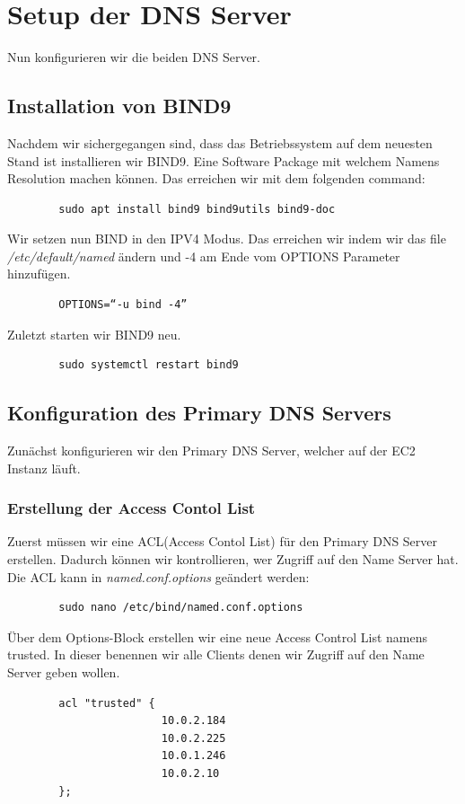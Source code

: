 \documentclass[a4paper,12pt]{article}
\begin{document}
\section{Setup der DNS Server}
Nun konfigurieren wir die beiden DNS Server.
\subsection{Installation von BIND9}
Nachdem wir sichergegangen sind, dass das Betriebssystem auf dem neuesten Stand ist installieren wir BIND9. 
Eine Software Package mit welchem Namens Resolution machen können. Das erreichen wir mit dem folgenden command:
\begin{verbatim}
		sudo apt install bind9 bind9utils bind9-doc
\end{verbatim}

Wir setzen nun BIND in den IPV4 Modus. Das erreichen wir indem wir das file \textit{/etc/default/named} ändern und -4 am Ende vom OPTIONS Parameter hinzufügen.
\begin{verbatim}
		OPTIONS=“-u bind -4”
\end{verbatim}
Zuletzt starten wir BIND9 neu.
\begin{verbatim}
		sudo systemctl restart bind9
\end{verbatim}



\subsection{Konfiguration des Primary DNS Servers}
Zunächst konfigurieren wir den Primary DNS Server, welcher auf der EC2 Instanz läuft.

\subsubsection{Erstellung der Access Contol List}
Zuerst müssen wir eine ACL(Access Contol List) für den Primary DNS Server erstellen. Dadurch können wir kontrollieren, wer Zugriff auf den Name Server hat.
Die ACL kann in \textit{named.conf.options} geändert werden:
\begin{verbatim}
		sudo nano /etc/bind/named.conf.options
\end{verbatim}


Über dem Options-Block erstellen wir eine neue Access Control List namens trusted.
In dieser benennen wir alle Clients denen wir Zugriff auf den Name Server geben wollen.
\begin{verbatim}
		acl "trusted" {
						10.0.2.184
						10.0.2.225
						10.0.1.246
						10.0.2.10
		};
\end{verbatim}
\end{document}
